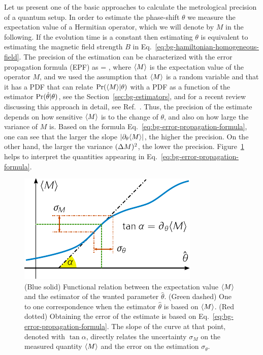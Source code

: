 Let us present one of the basic approaches to calculate the metrological precision of a quantum setup.
In order to estimate the phase-shift $\theta$ we measure the expectation value of a Hermitian operator, which we will denote by $M$ in the following.
If the evolution time is a constant then estimating $\theta$ is equivalent to estimating the magnetic field strength $B$ in Eq.~\eqref{eq:bg-hamiltonian-homogeneous-field}.
The precision of the estimation can be characterized with the error propagation formula (EPF) as
\be
  \label{eq:bg-error-propagation-formula}
  \varian{\theta} = ,
\ee
where $\langle{M}\rangle$ is the expectation value of the operator $M$, and we used the assumption that $\langle{M}\rangle$ is a random variable and that it has a PDF that can relate $\text{Pr}(\langle{M}\rangle|\theta)$ with a PDF as a function of the estimator $\text{Pr}(\hat{\theta}|\theta)$, see the Section~\ref{sec:bg-estimators}, and for a recent review discussing this approach in detail, see Ref.~\cite{Kolodynski2010}.
Thus, the precision of the estimate depends on how sensitive $\langle{M}\rangle$ is to the change of $\theta$, and also on how large the variance of $M$ is.
Based on the formula Eq.~\eqref{eq:bg-error-propagation-formula}, one can see that the larger the slope $|\partial_\theta \langle{M}\rangle|$, the higher the precision.
On the other hand, the larger the variance $(\Delta M )^2$, the lower the precision.
Figure~\ref{fig:bg-expect-m-evo} helps to interpret the quantities appearing in Eq.~\eqref{eq:bg-error-propagation-formula}.
\begin{figure}[htp]
  \centering
  \includegraphics[scale=1.2]{img/BG_expect_m_evo.pdf}
  \caption[Error-propagation formula]{
  (Blue solid) Functional relation between the expectation value $\langle{M}\rangle$ and the estimator of the wanted parameter $\hat\theta$.
  (Green dashed) One to one correspondence when the estimator $\hat{\theta}$ is based on $\langle{M}\rangle$. (Red dotted) Obtaining the error of the estimate is based on Eq.~\eqref{eq:bg-error-propagation-formula}.
  The slope of the curve at that point, denoted with $\tan\alpha$, directly relates the uncertainty $\sigma_M$ on the measured quantity $\langle{M}\rangle$ and the error on the estimation $\sigma_\theta$.}
  \label{fig:bg-expect-m-evo}
\end{figure}

